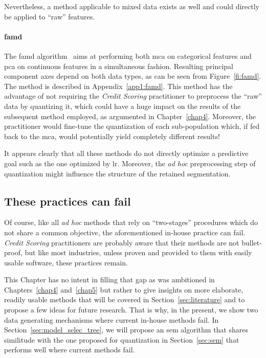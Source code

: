 Nevertheless, a method applicable to mixed data exists as well and could directly be applied to ``raw'' features.

\paragraph{\gls{famd}}

The \gls{famd} algorithm~\cite{pages2014multiple} aims at performing both \gls{mca} on categorical features and \gls{pca} on continuous features in a simultaneous fashion. Resulting principal component axes depend on both data types, as can be seen from Figure~\ref{fi:famd}. The method is described in Appendix~\ref{app1:famd}. This method has the advantage of not requiring the \textit{Credit Scoring} practitioner to preprocess the ``raw'' data by quantizing it, which could have a huge impact on the results of the subsequent method employed, as argumented in Chapter~\ref{chap4}. Moreover, the practitioner would fine-tune the quantization of each sub-population which, if fed back to the \gls{mca}, would potentially yield completely different results!

It appears clearly that all these methods do not directly optimize a predictive goal such as the one optimized by \gls{lr}. Moreover, the \textit{ad hoc} preprocessing step of quantization might influence the structure of the retained segmentation.

\subsection{These practices can fail}

Of course, like all \textit{ad hoc} methods that rely on ``two-stages'' procedures which do not share a common objective, the aforementioned in-house practice can fail. \textit{Credit Scoring} practitioners are probably aware that their methods are not bullet-proof, but like most industries, unless proven and provided to them with easily usable software, these practices remain.

This Chapter has no intent in filling that gap as was ambitioned in Chapters~\ref{chap4} and~\ref{chap5} but rather to give insights on more elaborate, readily usable methods that will be covered in Section~\ref{sec:literature} and to propose a few ideas for future research. That is why, in the present, we show two data generating mechanisms where current in-house methods fail. In Section~\ref{sec:model_selec_tree}, we will propose an \gls{sem} algorithm that shares similitude with the one proposed for quantization in Section~\ref{sec:sem} that performs well where current methods fail.

